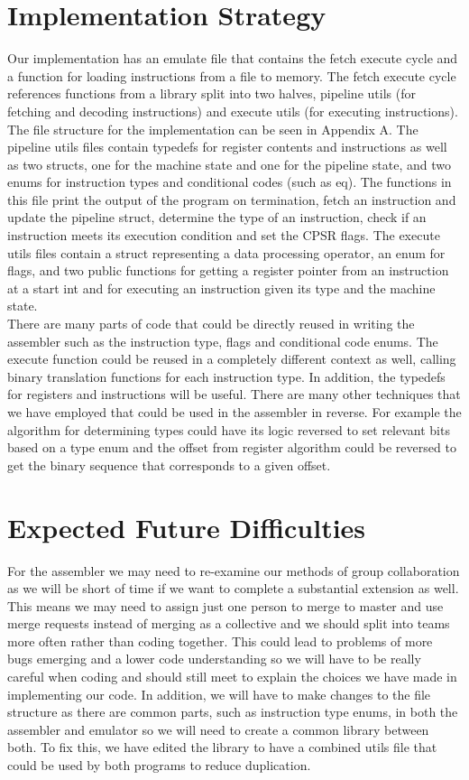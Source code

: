 \documentclass[11pt]{article}
\begin{document}
\section{Implementation Strategy}
Our implementation has an emulate file that contains the fetch execute cycle and a function for loading instructions from a file to memory. The fetch execute cycle references functions from a library split into two halves, pipeline utils (for fetching and decoding instructions) and execute utils (for executing instructions). The file structure for the implementation can be seen in Appendix A.
The pipeline utils files contain typedefs for register contents and instructions as well as two structs, one for the machine state and one for the pipeline state, and two enums for instruction types and conditional codes (such as eq). The functions in this file print the output of the program on termination, fetch an instruction and update the pipeline struct, determine the type of an instruction, check if an instruction meets its execution condition and set the CPSR flags. The execute utils files contain a struct representing a data processing operator, an enum for flags, and two public functions for getting a register pointer from an instruction at a start int and for executing an instruction given its type and the machine state. \\
\indent There are many parts of code that could be directly reused in writing the assembler such as the instruction type, flags and conditional code enums. The execute function could be reused in a completely different context as well, calling binary translation functions for each instruction type. In addition, the typedefs for registers and instructions will be useful. There are many other techniques that we have employed that could be used in the assembler in reverse. For example the algorithm for determining types could have its logic reversed to set relevant bits based on a type enum and the offset from register algorithm could be reversed to get the binary sequence that corresponds to a given offset.


\section{Expected Future Difficulties}
For the assembler we may need to re-examine our methods of group collaboration as we will be short of time if we want to complete a substantial extension as well. This means we may need to assign just one person to merge to master and use merge requests instead of merging as a collective and we should split into teams more often rather than coding together. This could lead to problems of more bugs emerging and a lower code understanding so we will have to be really careful when coding and should still meet to explain the choices we have made in implementing our code. In addition, we will have to make changes to the file structure as there are common parts, such as instruction type enums, in both the assembler and emulator so we will need to create a common library between both. To fix this, we have edited the library to have a combined utils file that could be used by both programs to reduce duplication.
\end{document}
